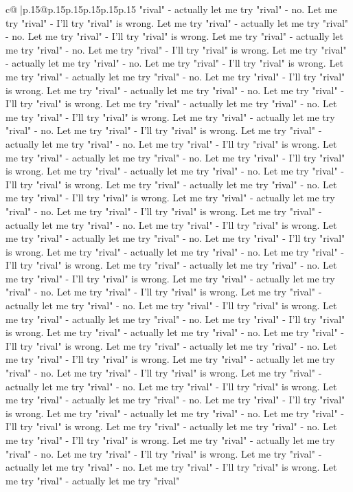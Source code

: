 \documentclass{article}
\begin{document}
{\begin{supertabular}{c@{$\;$}|p{.15\linewidth}@{}p{.15\linewidth}p{.15\linewidth}p{.15\linewidth}p{.15\linewidth}p{.15\linewidth}}
{{{"rival" {-} actually let me try "rival" {-} no. Let me try "rival" {-} I'll try "rival" is wrong. Let me try "rival" {-} actually let me try "rival" {-} no. Let me try "rival" {-} I'll try "rival" is wrong. Let me try "rival" {-} actually let me try "rival" {-} no. Let me try "rival" {-} I'll try "rival" is wrong. Let me try "rival" {-} actually let me try "rival" {-} no. Let me try "rival" {-} I'll try "rival" is wrong. Let me try "rival" {-} actually let me try "rival" {-} no. Let me try "rival" {-} I'll try "rival" is wrong. Let me try "rival" {-} actually let me try "rival" {-} no. Let me try "rival" {-} I'll try "rival" is wrong. Let me try "rival" {-} actually let me try "rival" {-} no. Let me try "rival" {-} I'll try "rival" is wrong. Let me try "rival" {-} actually let me try "rival" {-} no. Let me try "rival" {-} I'll try "rival" is wrong. Let me try "rival" {-} actually let me try "rival" {-} no. Let me try "rival" {-} I'll try "rival" is wrong. Let me try "rival" {-} actually let me try "rival" {-} no. Let me try "rival" {-} I'll try "rival" is wrong. Let me try "rival" {-} actually let me try "rival" {-} no. Let me try "rival" {-} I'll try "rival" is wrong. Let me try "rival" {-} actually let me try "rival" {-} no. Let me try "rival" {-} I'll try "rival" is wrong. Let me try "rival" {-} actually let me try "rival" {-} no. Let me try "rival" {-} I'll try "rival" is wrong. Let me try "rival" {-} actually let me try "rival" {-} no. Let me try "rival" {-} I'll try "rival" is wrong. Let me try "rival" {-} actually let me try "rival" {-} no. Let me try "rival" {-} I'll try "rival" is wrong. Let me try "rival" {-} actually let me try "rival" {-} no. Let me try "rival" {-} I'll try "rival" is wrong. Let me try "rival" {-} actually let me try "rival" {-} no. Let me try "rival" {-} I'll try "rival" is wrong. Let me try "rival" {-} actually let me try "rival" {-} no. Let me try "rival" {-} I'll try "rival" is wrong. Let me try "rival" {-} actually let me try "rival" {-} no. Let me try "rival" {-} I'll try "rival" is wrong. Let me try "rival" {-} actually let me try "rival" {-} no. Let me try "rival" {-} I'll try "rival" is wrong. Let me try "rival" {-} actually let me try "rival" {-} no. Let me try "rival" {-} I'll try "rival" is wrong. Let me try "rival" {-} actually let me try "rival" {-} no. Let me try "rival" {-} I'll try "rival" is wrong. Let me try "rival" {-} actually let me try "rival" {-} no. Let me try "rival" {-} I'll try "rival" is wrong. Let me try "rival" {-} actually let me try "rival" {-} no. Let me try "rival" {-} I'll try "rival" is wrong. Let me try "rival" {-} actually let me try "rival" {-} no. Let me try "rival" {-} I'll try "rival" is wrong. Let me try "rival" {-} actually let me try "rival" {-} no. Let me try "rival" {-} I'll try "rival" is wrong. Let me try "rival" {-} actually let me try "rival" {-} no. Let me try "rival" {-} I'll try "rival" is wrong. Let me try "rival" {-} actually let me try "rival" {-} no. Let me try "rival" {-} I'll try "rival" is wrong. Let me try "rival" {-} actually let me try "rival" {-} no. Let me try "rival" {-} I'll try "rival" is wrong. Let me try "rival" {-} actually let me try "rival" }}}
\end{supertabular}}
\end{document}
